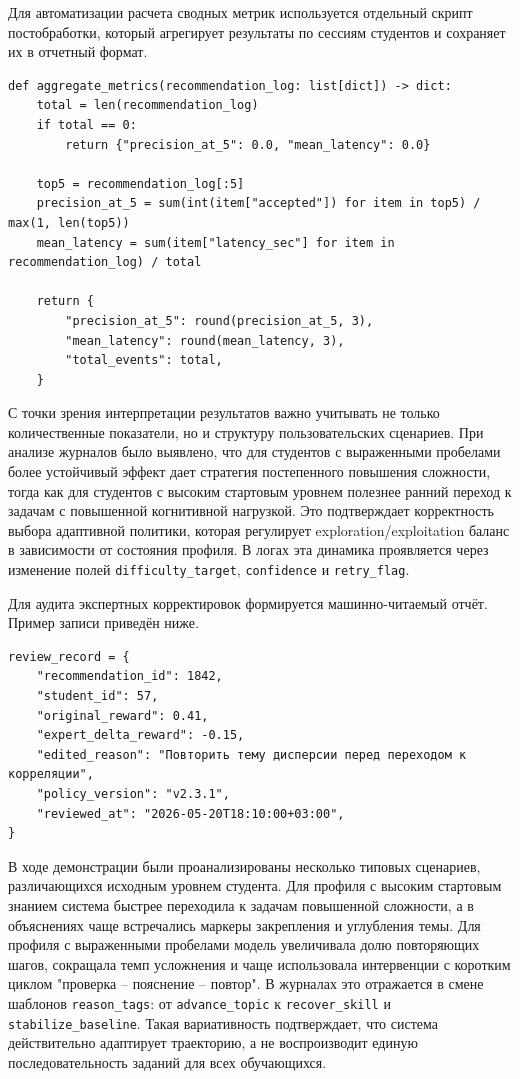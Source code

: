 Для автоматизации расчета сводных метрик используется отдельный скрипт
постобработки, который агрегирует результаты по сессиям студентов и сохраняет
их в отчетный формат.

\begin{lstlisting}[style=sthgcode-python,caption={Пример расчета сводных метрик по журналу рекомендаций}]
def aggregate_metrics(recommendation_log: list[dict]) -> dict:
    total = len(recommendation_log)
    if total == 0:
        return {"precision_at_5": 0.0, "mean_latency": 0.0}

    top5 = recommendation_log[:5]
    precision_at_5 = sum(int(item["accepted"]) for item in top5) / max(1, len(top5))
    mean_latency = sum(item["latency_sec"] for item in recommendation_log) / total

    return {
        "precision_at_5": round(precision_at_5, 3),
        "mean_latency": round(mean_latency, 3),
        "total_events": total,
    }
\end{lstlisting}

С точки зрения интерпретации результатов важно учитывать не только
количественные показатели, но и структуру пользовательских сценариев. При
анализе журналов было выявлено, что для студентов с выраженными пробелами более
устойчивый эффект дает стратегия постепенного повышения сложности, тогда как
для студентов с высоким стартовым уровнем полезнее ранний переход к задачам с
повышенной когнитивной нагрузкой. Это подтверждает корректность выбора
адаптивной политики, которая регулирует exploration/exploitation баланс в
зависимости от состояния профиля. В логах эта динамика проявляется через
изменение полей \texttt{difficulty\_target}, \texttt{confidence} и
\texttt{retry\_flag}.

Для аудита экспертных корректировок формируется машинно-читаемый отчёт. Пример
записи приведён ниже.

\begin{lstlisting}[style=sthgcode-python,caption={Пример JSON-представления записи экспертной ревизии}]
review_record = {
    "recommendation_id": 1842,
    "student_id": 57,
    "original_reward": 0.41,
    "expert_delta_reward": -0.15,
    "edited_reason": "Повторить тему дисперсии перед переходом к корреляции",
    "policy_version": "v2.3.1",
    "reviewed_at": "2026-05-20T18:10:00+03:00",
}
\end{lstlisting}

В ходе демонстрации были проанализированы несколько типовых сценариев,
различающихся исходным уровнем студента. Для профиля с высоким стартовым
знанием система быстрее переходила к задачам повышенной сложности, а в
объяснениях чаще встречались маркеры закрепления и углубления темы. Для профиля
с выраженными пробелами модель увеличивала долю повторяющих шагов, сокращала
темп усложнения и чаще использовала интервенции с коротким циклом "проверка --
пояснение -- повтор". В журналах это отражается в смене шаблонов
\texttt{reason\_tags}: от \texttt{advance\_topic} к \texttt{recover\_skill} и
\texttt{stabilize\_baseline}. Такая вариативность подтверждает, что система
действительно адаптирует траекторию, а не воспроизводит единую
последовательность заданий для всех обучающихся.

